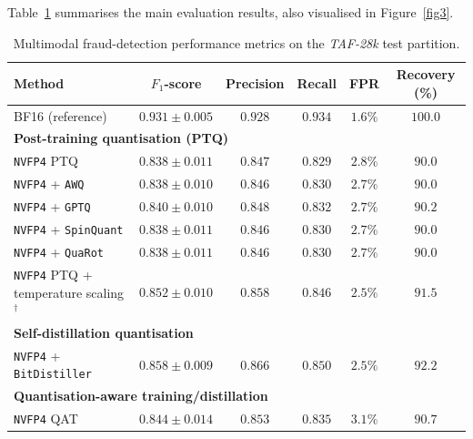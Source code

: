 \documentclass[a4paper,fleqn]{cas-sc}
\begin{document}
Table~\ref{tab3-en} summarises the main evaluation results, also visualised in Figure~\ref{fig3}.

\begin{table}[t]
\centering
\caption{Multimodal fraud-detection performance metrics on the \textit{TAF-28k} test partition.}
\label{tab3-en}
\small
\renewcommand{\arraystretch}{1.15}
\begin{tabularx}{\textwidth}{Xccccc}
\toprule
\textbf{Method} &
\textbf{$F_1$-score} &
\textbf{Precision} &
\textbf{Recall} &
\textbf{FPR} &
\textbf{Recovery (\%)} \\
\midrule

BF16 (reference) &
$0.931 \pm 0.005$ &
$0.928$ &
$0.934$ &
$1.6\%$ &
$100.0$ \\

\midrule
\multicolumn{6}{l}{\textbf{Post-training quantisation (PTQ)}} \\

\texttt{NVFP4} PTQ &
$0.838 \pm 0.011$ &
$0.847$ &
$0.829$ &
$2.8\%$ &
$90.0$ \\

\texttt{NVFP4} + \texttt{AWQ} &
$0.838 \pm 0.010$ &
$0.846$ &
$0.830$ &
$2.7\%$ &
$90.0$ \\

\texttt{NVFP4} + \texttt{GPTQ} &
$0.840 \pm 0.010$ &
$0.848$ &
$0.832$ &
$2.7\%$ &
$90.2$ \\

\texttt{NVFP4} + \texttt{SpinQuant} &
$0.838 \pm 0.011$ &
$0.846$ &
$0.830$ &
$2.7\%$ &
$90.0$ \\

\texttt{NVFP4} + \texttt{QuaRot} &
$0.838 \pm 0.011$ &
$0.846$ &
$0.830$ &
$2.7\%$ &
$90.0$ \\

\texttt{NVFP4} PTQ + temperature scaling$^{\dagger}$ &
$0.852 \pm 0.010$ &
$0.858$ &
$0.846$ &
$2.5\%$ &
$91.5$ \\

\midrule
\multicolumn{6}{l}{\textbf{Self-distillation quantisation}} \\

\texttt{NVFP4} + \texttt{BitDistiller} &
$0.858 \pm 0.009$ &
$0.866$ &
$0.850$ &
$2.5\%$ &
$92.2$ \\

\midrule
\multicolumn{6}{l}{\textbf{Quantisation-aware training/distillation}} \\

\texttt{NVFP4} QAT &
$0.844 \pm 0.014$ &
$0.853$ &
$0.835$ &
$3.1\%$ &
$90.7$ \\


\end{tabularx}
\end{table}
\end{document}
